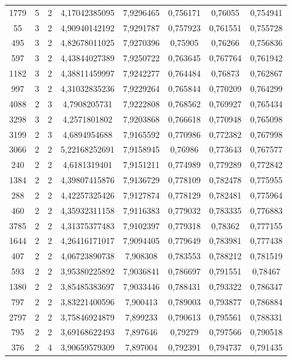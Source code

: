 \begin{longtable}{|c|c|c|c|c|c|c|c|}
1779 & 5 & 2 & 4,17042385095 & 7,9296465 & 0,756171 & 0,76055 & 0,754941 \\
55 & 3 & 2 & 4,90940142192 & 7,9291787 & 0,757923 & 0,761551 & 0,755728 \\
495 & 3 & 2 & 4,82678011025 & 7,9270396 & 0,75905 & 0,76266 & 0,756836 \\
597 & 3 & 2 & 4,43844027389 & 7,9250722 & 0,763645 & 0,767764 & 0,761942 \\
1182 & 3 & 2 & 4,38811459997 & 7,9242277 & 0,764484 & 0,76873 & 0,762867 \\
997 & 3 & 2 & 4,31032835236 & 7,9229264 & 0,765844 & 0,770209 & 0,764299 \\
4088 & 2 & 3 & 4,7908205731 & 7,9222808 & 0,768562 & 0,769927 & 0,765434 \\
3298 & 3 & 2 & 4,2571801802 & 7,9203868 & 0,766618 & 0,770948 & 0,765098 \\
3199 & 2 & 3 & 4,6894954688 & 7,9165592 & 0,770986 & 0,772382 & 0,767998 \\
3066 & 2 & 2 & 5,22168252691 & 7,9158945 & 0,76986 & 0,773643 & 0,767577 \\
240 & 2 & 2 & 4,6181319401 & 7,9151211 & 0,774989 & 0,779289 & 0,772842 \\
1384 & 2 & 2 & 4,39807415876 & 7,9136729 & 0,778109 & 0,782478 & 0,775955 \\
288 & 2 & 2 & 4,42257325426 & 7,9127874 & 0,778129 & 0,782481 & 0,775964 \\
460 & 2 & 2 & 4,35932311158 & 7,9116383 & 0,779032 & 0,783335 & 0,776883 \\
3785 & 2 & 2 & 4,31375377483 & 7,9102397 & 0,779318 & 0,78362 & 0,777155 \\
1644 & 2 & 2 & 4,26416171017 & 7,9094405 & 0,779649 & 0,783981 & 0,777438 \\
407 & 2 & 2 & 4,06723890738 & 7,908308 & 0,783553 & 0,788212 & 0,781519 \\
593 & 2 & 2 & 3,95380225892 & 7,9036841 & 0,786697 & 0,791551 & 0,78467 \\
1380 & 2 & 2 & 3,85485383697 & 7,9033446 & 0,788431 & 0,793322 & 0,786347 \\
797 & 2 & 2 & 3,83221400596 & 7,900413 & 0,789003 & 0,793877 & 0,786884 \\
2797 & 2 & 2 & 3,75846924879 & 7,899233 & 0,790613 & 0,795561 & 0,788331 \\
795 & 2 & 2 & 3,69168622493 & 7,897646 & 0,79279 & 0,797566 & 0,790518 \\
376 & 2 & 4 & 3,90659579309 & 7,897004 & 0,792391 & 0,794737 & 0,791435 \\

\end{longtable}
